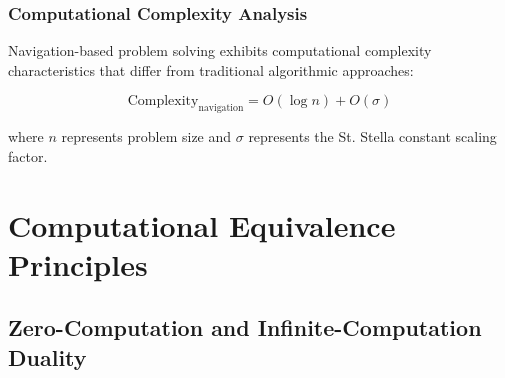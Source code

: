 \documentclass[11pt]{article}
\begin{document}
\begin{figure}[H]
\begin{center}
\end{center}
\end{figure}

\subsubsection{Computational Complexity Analysis}

Navigation-based problem solving exhibits computational complexity characteristics that differ from traditional algorithmic approaches:

\begin{equation}
\text{Complexity}_{\text{navigation}} = O(\log n) + O(\sigma)
\label{eq:navigation_complexity}
\end{equation}

where $n$ represents problem size and $\sigma$ represents the St. Stella constant scaling factor.

\section{Computational Equivalence Principles}

\subsection{Zero-Computation and Infinite-Computation Duality}
\end{document}
